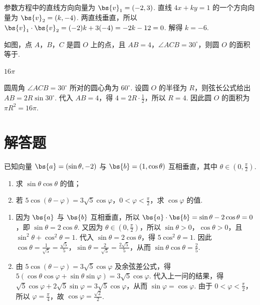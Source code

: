 \begin{solution}
参数方程中的直线方向向量为 \(\bs{v}_1=(-2,3)\). 直线 \(4x+ky=1\) 的一个方向向量为 \(\bs{v}_2=(k,-4)\). 两直线垂直，所以
\(\bs{v}_1\cdot\bs{v}_2=(-2)k+3(-4)=-2k-12=0\).
解得 \(k=-6\).
\end{solution}

\begin{problem}
如图，点 \(A\)，\(B\)，\(C\) 是圆 \(O\) 上的点，且 \(AB = 4\)，\(\angle ACB = 30^{\circ}\)，则圆 \(O\) 的面积等于\fillinblank{}.

\end{problem}

\begin{answer}
\(16\pi\)
\end{answer}

\begin{solution}
圆周角 \(\angle ACB=30^\circ\) 所对的圆心角为 \(60^\circ\). 设圆 \(O\) 的半径为 \(R\)，则弦长公式给出
\(AB=2R\sin30^\circ\).
代入 \(AB=4\)，得 \(4=2R\cdot\frac12\)，所以 \(R=4\). 因此圆 \(O\) 的面积为 \(\pi R^2=16\pi\).
\end{solution}

\section{解答题}

\begin{problem}
已知向量 \( \bs{a} = (\sin\theta, -2) \) 与 \( \bs{b} = (1, \cos\theta) \) 互相垂直，其中 \( \theta \in \left(0, \frac{\pi}{2}\right) \).
\begin{enumerate}
\item 求 \(\sin\theta\cos\theta\) 的值；
\item 若 \(5\cos(\theta - \varphi) = 3\sqrt{5}\cos\varphi\)，\(0 < \varphi < \frac{\pi}{2}\)，求 \(\cos\varphi\) 的值.
\end{enumerate}
\end{problem}

\begin{solution}
\begin{enumerate}
\item 因为 \(\bs{a}\) 与 \(\bs{b}\) 互相垂直，所以
\(\bs{a}\cdot\bs{b}=\sin\theta-2\cos\theta=0\)，即 \(\sin\theta=2\cos\theta\). 又因为 \(\theta\in\left(0,\frac{\pi}{2}\right)\)，所以 \(\sin\theta>0\)，\(\cos\theta>0\)，且
\(\sin^2\theta+\cos^2\theta=1\). 代入 \(\sin\theta=2\cos\theta\)，得 \(5\cos^2\theta=1\). 因此
\(\cos\theta=\frac{1}{\sqrt5}=\frac{\sqrt5}{5}\)，\(\sin\theta=\frac{2}{\sqrt5}=\frac{2\sqrt5}{5}\)，从而 \(\sin\theta\cos\theta=\frac25\).
\item 由 \(5\cos(\theta-\varphi)=3\sqrt5\cos\varphi\) 及余弦差公式，得
\(5(\cos\theta\cos\varphi+\sin\theta\sin\varphi)=3\sqrt5\cos\varphi\). 代入上一问的结果，得
\(\sqrt5\cos\varphi+2\sqrt5\sin\varphi=3\sqrt5\cos\varphi\)，从而 \(\sin\varphi=\cos\varphi\). 由于 \(0<\varphi<\frac{\pi}{2}\)，所以 \(\varphi=\frac{\pi}{4}\)，故
\(\cos\varphi=\frac{\sqrt2}{2}\).
\end{enumerate}
\end{solution}

